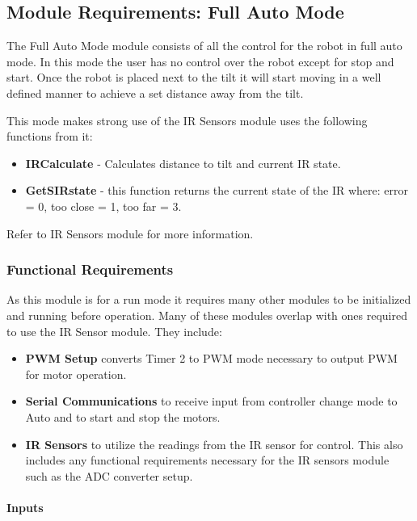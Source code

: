 \documentclass{article}
\begin{document}
	
	\subsection{Module Requirements: Full Auto Mode}
	The Full Auto Mode module consists of all the control for the robot in full auto mode.	In this mode the user has no control over the robot except for stop and start. Once the robot is placed next to the tilt it will start moving in a well defined manner to achieve a set distance away from the tilt. 
	
	This mode makes strong use of the IR Sensors module uses the following functions from it: 
	
	\begin{itemize}
		\item \textbf{IR\textunderscore Calculate} - Calculates distance to tilt and current IR state.
		\item \textbf{Get\textunderscore S\textunderscore IR\textunderscore state} - this function returns the current state of the IR where: error = 0, too close = 1, too far = 3.
	\end{itemize} 
	Refer to IR Sensors module for more information. 
	
	\subsubsection{Functional Requirements}
 
	As this module is for a run mode it requires many other modules to be initialized and running before operation. Many of these modules overlap with ones required to use the IR Sensor module. They include:
	
	\begin{itemize}
		\item \textbf{PWM Setup} converts Timer 2 to PWM mode necessary to output PWM for motor operation.
		\item \textbf{Serial Communications} to receive input from controller change mode to Auto and to start and stop the motors.
		\item \textbf{IR Sensors} to utilize the readings from the IR sensor for control. This also includes any functional requirements necessary for the IR sensors module such as the ADC converter setup.
	\end{itemize} 
	
	
	\paragraph{Inputs}
	
\end{document}
